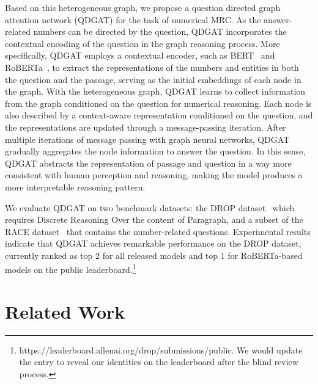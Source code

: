 \documentclass{article}
\begin{document}
Based on this heterogeneous graph, we propose a question directed graph attention network (QDGAT) for the task of numerical MRC.
As the answer-related numbers can be directed by the question, QDGAT incorporates the contextual encoding of the question in the graph reasoning process.
More specifically, QDGAT employs a contextual encoder, such as BERT~\cite{devlin-etal-2019-bert} and RoBERTa~\cite{DBLP:journals/corr/abs-1907-11692}, to extract the representations of the numbers and entities in both the question and the passage, serving as the initial embeddings of each node in the graph.
With the heterogeneous graph, QDGAT learns to collect information from the graph conditioned on the question for numerical reasoning.
Each node is also described by a context-aware representation conditioned on the question, and the representations are updated through a message-passing iteration.
After multiple iterations of message passing with graph neural networks, QDGAT gradually aggregates the node information to answer the question.
In this sense, QDGAT abstracts the representation of passage and question in a way more consistent with human perception and reasoning, making the model produces a more interpretable reasoning pattern.


We evaluate QDGAT on two benchmark datasets: the DROP dataset~\cite{DBLP:conf/naacl/DuaWDSS019} which requires Discrete Reasoning Over the content of Paragraph, and a subset of the RACE dataset~\cite{lai-etal-2017-race} that contains the number-related questions.
Experimental results indicate that QDGAT achieves remarkable performance on the DROP dataset, currently ranked as top 2 for all released models and top 1 for RoBERTa-based models on the public leaderboard.\footnote{{https://leaderboard.allenai.org/drop/submissions/public}.
We would update the entry to reveal our identities on the leaderboard after the blind review process.}







\section{Related Work}
\end{document}
